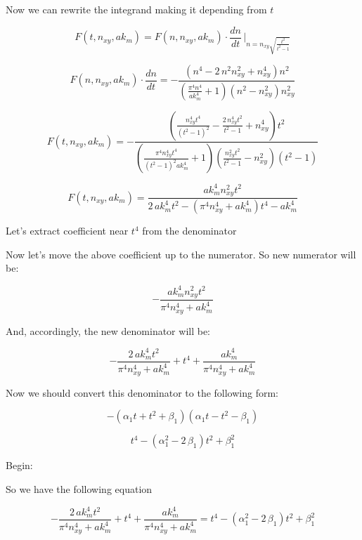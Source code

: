 \documentclass[11pt]{article}
\begin{document}
    Now we can rewrite the integrand making it depending from \(t\)

    \[F\left(t, n_{xy}, ak_m\right) = F\left(n, n_{xy}, ak_m\right) \cdot \frac{dn}{dt} \, \Bigg\rvert_{ n = n_{\mathit{xy}} \sqrt{\frac{t^{2}}{t^{2} - 1}} }\]

\[F\left(n, n_{xy}, ak_m\right) \cdot \frac{dn}{dt} = -\frac{{\left(n^{4} - 2 \, n^{2} n_{\mathit{xy}}^{2} + n_{\mathit{xy}}^{4}\right)} n^{2}}{{\left(\frac{\pi^{4} n^{4}}{\mathit{ak}_{m}^{4}} + 1\right)} {\left(n^{2} - n_{\mathit{xy}}^{2}\right)} n_{\mathit{xy}}^{2}}\]

\[F\left(t, n_{xy}, ak_m\right) = -\frac{{\left(\frac{n_{\mathit{xy}}^{4} t^{4}}{{\left(t^{2} - 1\right)}^{2}} - \frac{2 \, n_{\mathit{xy}}^{4} t^{2}}{t^{2} - 1} + n_{\mathit{xy}}^{4}\right)} t^{2}}{{\left(\frac{\pi^{4} n_{\mathit{xy}}^{4} t^{4}}{{\left(t^{2} - 1\right)}^{2} \mathit{ak}_{m}^{4}} + 1\right)} {\left(\frac{n_{\mathit{xy}}^{2} t^{2}}{t^{2} - 1} - n_{\mathit{xy}}^{2}\right)} {\left(t^{2} - 1\right)}}\]

\[F\left(t, n_{xy}, ak_m\right) = \frac{\mathit{ak}_{m}^{4} n_{\mathit{xy}}^{2} t^{2}}{2 \, \mathit{ak}_{m}^{4} t^{2} - {\left(\pi^{4} n_{\mathit{xy}}^{4} + \mathit{ak}_{m}^{4}\right)} t^{4} - \mathit{ak}_{m}^{4}}\]

    Let's extract coefficient near \(t^4\) from the denominator

    Now let's move the above coefficient up to the numerator. So new
numerator will be:

    \[-\frac{\mathit{ak}_{m}^{4} n_{\mathit{xy}}^{2} t^{2}}{\pi^{4} n_{\mathit{xy}}^{4} + \mathit{ak}_{m}^{4}}\]

    And, accordingly, the new denominator will be:

    \[-\frac{2 \, \mathit{ak}_{m}^{4} t^{2}}{\pi^{4} n_{\mathit{xy}}^{4} + \mathit{ak}_{m}^{4}} + t^{4} + \frac{\mathit{ak}_{m}^{4}}{\pi^{4} n_{\mathit{xy}}^{4} + \mathit{ak}_{m}^{4}}\]

    Now we should convert this denominator to the following form:

    \[-{\left(\alpha_{1} t + t^{2} + \beta_{1}\right)} {\left(\alpha_{1} t - t^{2} - \beta_{1}\right)}\]

\[t^{4} - {\left(\alpha_{1}^{2} - 2 \, \beta_{1}\right)} t^{2} + \beta_{1}^{2}\]

    Begin:

    So we have the following equation

\[-\frac{2 \, \mathit{ak}_{m}^{4} t^{2}}{\pi^{4} n_{\mathit{xy}}^{4} + \mathit{ak}_{m}^{4}} + t^{4} + \frac{\mathit{ak}_{m}^{4}}{\pi^{4} n_{\mathit{xy}}^{4} + \mathit{ak}_{m}^{4}} = t^{4} - {\left(\alpha_{1}^{2} - 2 \, \beta_{1}\right)} t^{2} + \beta_{1}^{2}\]
\end{document}
